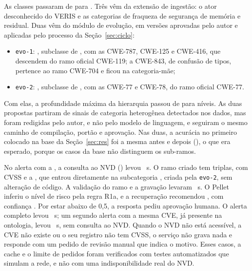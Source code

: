 As classes passaram de \lcBaseClasses{} para \lcRealClasses{}. Três vêm da extensão de ingestão: o ator desconhecido do VERIS e as categorias de fraqueza de segurança de memória e residual. Duas vêm do módulo de evolução, em versões aprovadas pelo autor e aplicadas pelo processo da Seção~\ref{sec:ciclo}:
\begin{itemize}
\item \texttt{evo-1}: , subclasse de , com as CWE-787, CWE-125 e CWE-416, que descendem do ramo oficial CWE-119; a CWE-843, de confusão de tipos, pertence ao ramo CWE-704 e ficou na categoria-mãe;
\item \texttt{evo-2}: , subclasse de , com as CWE-77 e CWE-78, do ramo oficial CWE-77.
\end{itemize}
Com elas, a profundidade máxima da hierarquia passou de \lcBaseDepth{} para \lcRealDepth{} níveis. As duas propostas partiram de sinais de categoria heterogênea detectados nos dados, mas foram redigidas pelo autor, e não pelo modelo de linguagem, e seguiram o mesmo caminho de compilação, portão e aprovação. Nas duas, a acurácia no primeiro colocado na base da Seção~\ref{sec:res} foi a mesma antes e depois (\lcBaseAcc{}), o que era esperado, porque os casos da base não distinguem os sub-ramos.

No alerta com a \lcCve{}, a consulta ao NVD (\lcNvdMode{}) levou \lcNvdSec{}~s. O ramo criado tem \lcEnrichTriples{} triplas, com CVSS \lcCvss{} e a \lcCwe{}, que entrou diretamente na subcategoria \oc{\lcCategory}, criada pela \texttt{evo-2}, sem alteração de código. A validação do ramo e a gravação levaram \lcEnrichSec{}~s. O Pellet inferiu o nível de risco \emph{\lcRisk} pela regra R1a, e a recuperação recomendou \oc{\lcAction}, com confiança \lcConfidence{}. Por estar abaixo de 0,5, a resposta pediu aprovação humana. O alerta completo levou \lcAlertOneSec{}~s; um segundo alerta com a mesma CVE, já presente na ontologia, levou \lcAlertTwoSec{}~s, sem consulta ao NVD. Quando o NVD não está acessível, a CVE não existe ou o seu registro não tem CVSS, o serviço não grava nada e responde com um pedido de revisão manual que indica o motivo. Esses casos, a cache e o limite de pedidos foram verificados com testes automatizados que simulam a rede, e não com uma indisponibilidade real do NVD.

